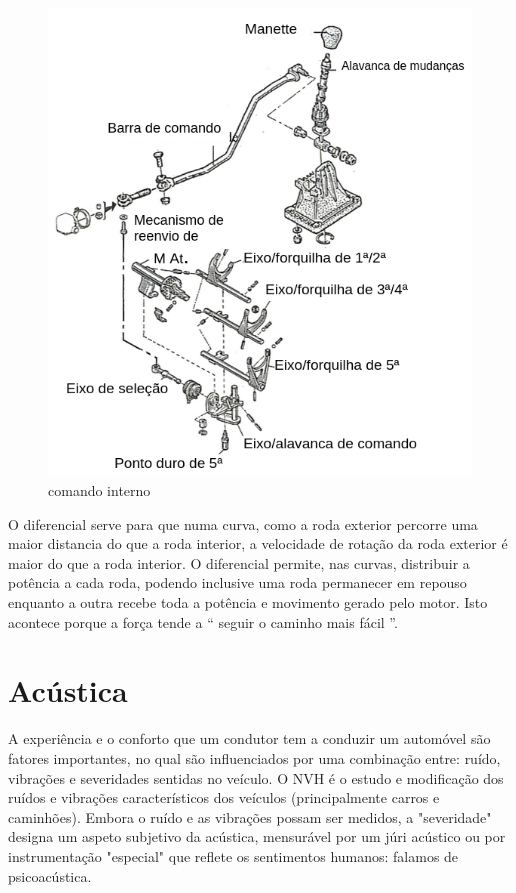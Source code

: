 \begin{figure}[H]
\centering
\includegraphics[scale=0.4]{figs/comando_interno}
\caption{comando interno}\label{comando interno}
\end{figure}

O diferencial serve para que numa curva, como a roda exterior percorre uma maior distancia do que a roda interior, a velocidade de rotação da roda exterior é maior do que a roda interior. O diferencial permite, nas curvas, distribuir a potência a cada roda, podendo inclusive uma roda permanecer em repouso enquanto a outra recebe toda a potência e movimento gerado pelo motor. Isto acontece porque a força tende a “ seguir o caminho mais fácil ”.


\section{Acústica}

A experiência e o conforto que um condutor tem a conduzir um automóvel são fatores importantes, no qual são influenciados por uma combinação entre: ruído, vibrações e severidades sentidas no veículo. O NVH é o estudo e modificação dos ruídos e vibrações característicos dos veículos (principalmente carros e caminhões). Embora o ruído e as vibrações possam ser medidos, a "severidade" designa um aspeto subjetivo da acústica, mensurável por um júri acústico ou por instrumentação "especial" que reflete os sentimentos humanos: falamos de psicoacústica. 

